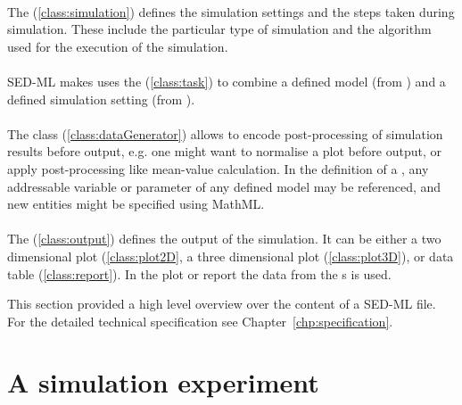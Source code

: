 \paragraph*{}
The  (\ref{class:simulation}) defines the simulation settings and the steps taken during simulation. These include the particular type of simulation and the algorithm used for the execution of the simulation.

\paragraph*{}
SED-ML makes uses the  (\ref{class:task}) to combine a defined model (from ) and a defined simulation setting (from ).

\paragraph*{}
The  class (\ref{class:dataGenerator}) allows to encode post-processing of simulation results before output, e.g. one might want to normalise a plot before output, or apply post-processing like mean-value calculation. In the definition of a , any addressable variable or parameter of any defined model may be referenced, and new entities might be specified using MathML.

\paragraph*{}
The  (\ref{class:output}) defines the output of the simulation. It can be either a two dimensional plot  (\ref{class:plot2D}, a three dimensional plot  (\ref{class:plot3D}), or data table  (\ref{class:report}). In the plot or report the data from the s is used.

This section provided a high level overview over the content of a SED-ML file. For the detailed technical specification see Chapter~\ref{chp:specification}. 

\section{A simulation experiment}
\label{motivation:example}

